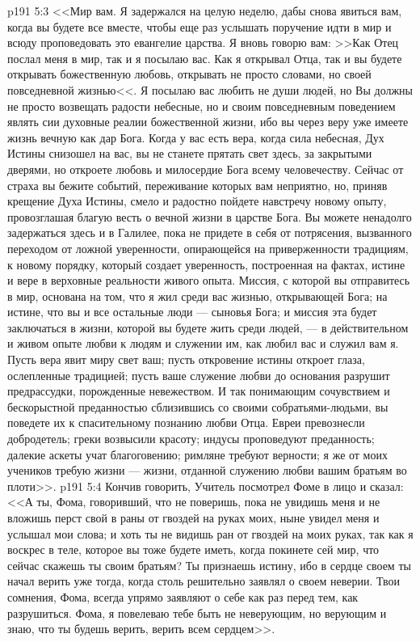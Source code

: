 \vs p191 5:3 <<Мир вам. Я задержался на целую неделю, дабы снова явиться вам, когда вы будете все вместе, чтобы еще раз услышать поручение идти в мир и всюду проповедовать это евангелие царства. Я вновь говорю вам: >>Как Отец послал меня в мир, так и я посылаю вас. Как я открывал Отца, так и вы будете открывать божественную любовь, открывать не просто словами, но своей повседневной жизнью<<. Я посылаю вас любить не души людей, но  Вы должны не просто возвещать радости небесные, но и своим повседневным поведением являть сии духовные реалии божественной жизни, ибо вы через веру уже имеете жизнь вечную как дар Бога. Когда у вас есть вера, когда сила небесная, Дух Истины снизошел на вас, вы не станете прятать свет здесь, за закрытыми дверями, но откроете любовь и милосердие Бога всему человечеству. Сейчас от страха вы бежите событий, переживание которых вам неприятно, но, приняв крещение Духа Истины, смело и радостно пойдете навстречу новому опыту, провозглашая благую весть о вечной жизни в царстве Бога. Вы можете ненадолго задержаться здесь и в Галилее, пока не придете в себя от потрясения, вызванного переходом от ложной уверенности, опирающейся на приверженности традициям, к новому порядку, который создает уверенность, построенная на фактах, истине и вере в верховные реальности живого опыта. Миссия, с которой вы отправитесь в мир, основана на том, что я жил среди вас жизнью, открывающей Бога; на истине, что вы и все остальные люди --- сыновья Бога; и миссия эта будет заключаться в жизни, которой вы будете жить среди людей, --- в действительном и живом опыте любви к людям и служении им, как любил вас и служил вам я. Пусть вера явит миру свет ваш; пусть откровение истины откроет глаза, ослепленные традицией; пусть ваше служение любви до основания разрушит предрассудки, порожденные невежеством. И так понимающим сочувствием и бескорыстной преданностью сблизившись со своими собратьями\hyp{}людьми, вы поведете их к спасительному познанию любви Отца. Евреи превознесли добродетель; греки возвысили красоту; индусы проповедуют преданность; далекие аскеты учат благоговению; римляне требуют верности; я же от моих учеников требую жизни --- жизни, отданной служению любви вашим братьям во плоти>>.
\vs p191 5:4 Кончив говорить, Учитель посмотрел Фоме в лицо и сказал: <<А ты, Фома, говоривший, что не поверишь, пока не увидишь меня и не вложишь перст свой в раны от гвоздей на руках моих, ныне увидел меня и услышал мои слова; и хоть ты не видишь ран от гвоздей на моих руках, так как я воскрес в теле, которое вы тоже будете иметь, когда покинете сей мир, что сейчас скажешь ты своим братьям? Ты признаешь истину, ибо в сердце своем ты начал верить уже тогда, когда столь решительно заявлял о своем неверии. Твои сомнения, Фома, всегда упрямо заявляют о себе как раз перед тем, как разрушиться. Фома, я повелеваю тебе быть не неверующим, но верующим и знаю, что ты будешь верить, верить всем сердцем>>.

